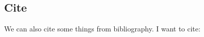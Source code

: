\subsection{Cite}
We can also cite some things from bibliography. I want to cite: \cite{sim_models}\cite{accidents}\cite{aggr_timid_driv}



